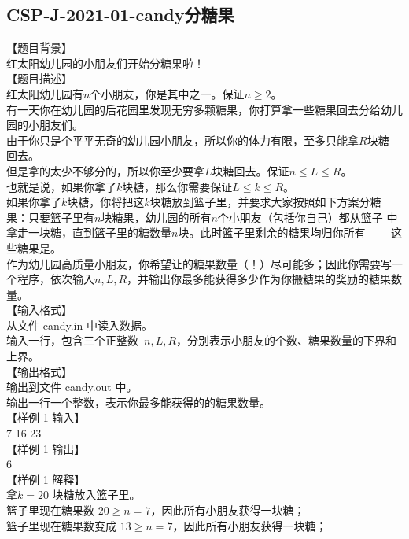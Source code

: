 \documentclass[12pt,twiside,a4paper]{ctexbook}
\numberwithin{chapter}{part}
\begin{document}
\subsection{CSP-J-2021-01-candy分糖果}
【题目背景】\\
红太阳幼儿园的小朋友们开始分糖果啦！\\
【题目描述】\\
红太阳幼儿园有$n$个小朋友，你是其中之一。保证$n\geq2$。\\
有一天你在幼儿园的后花园里发现无穷多颗糖果，你打算拿一些糖果回去分给幼儿
园的小朋友们。\\
由于你只是个平平无奇的幼儿园小朋友，所以你的体力有限，至多只能拿$R$块糖
回去。\\
但是拿的太少不够分的，所以你至少要拿$L$块糖回去。保证$n\leq L\leq R$。\\
也就是说，如果你拿了$k$块糖，那么你需要保证$L\leq k\leq R$。\\
如果你拿了$k$块糖，你将把这$k$块糖放到篮子里，并要求大家按照如下方案分糖
果：只要篮子里有$n$块糖果，幼儿园的所有$n$个小朋友（包括你自己）都从篮子
中拿走一块糖，直到篮子里的糖数量$n$块。此时篮子里剩余的糖果均归你所有
——这些糖果是。\\
作为幼儿园高质量小朋友，你希望让的糖果数量（！）尽可能多；因此你需要写一个程序，依次输入$n, L, R$，并输出你最多能获得多少作为你搬糖果的奖励的糖果数量。\\
【输入格式】\\
从文件 candy.in 中读入数据。\\
输入一行，包含三个正整数 $n, L, R$，分别表示小朋友的个数、糖果数量的下界和上界。\\
【输出格式】\\
输出到文件 candy.out 中。\\
输出一行一个整数，表示你最多能获得的的糖果数量。\\
【样例 1 输入】\\
7 16 23\\
【样例 1 输出】\\
6\\
【样例 1 解释】\\
拿$k = 20$ 块糖放入篮子里。\\
篮子里现在糖果数 $20 \geq n = 7$，因此所有小朋友获得一块糖；\\
篮子里现在糖果数变成 $13 \geq n = 7$，因此所有小朋友获得一块糖；\\
\end{document}
